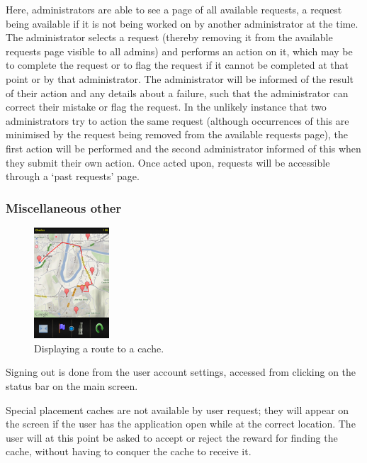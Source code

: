 Here, administrators are able to see a page of all available requests, a request being available if it is not being worked on by another administrator at the time. The administrator selects a request (thereby removing it from the available requests page visible to all admins) and performs an action on it, which may be to complete the request or to flag the request if it cannot be completed at that point or by that administrator. The administrator will be informed of the result of their action and any details about a failure, such that the administrator can correct their mistake or flag the request. In the unlikely instance that two administrators try to action the same request (although occurrences of this are minimised by the request being removed from the available requests page), the first action will be performed and the second administrator informed of this when they submit their own action. Once acted upon, requests will be accessible through a ‘past requests’ page.

\subsubsection{Miscellaneous other}

\begin{figure}
	\vspace{-40pt}
	\begin{center}
	\includegraphics[width=0.25\textwidth]{images/route_mapping}
	\caption{Displaying a route to a cache.}
	\label{route_mapping}
	\end{center}
	\vspace{-80pt}
\end{figure}

Signing out is done from the user account settings, accessed from clicking on the status bar on the main screen.

Special placement caches are not available by user request; they will appear on the screen if the user has the application open while at the correct location. The user will at this point be asked to accept or reject the reward for finding the cache, without having to conquer the cache to receive it.


